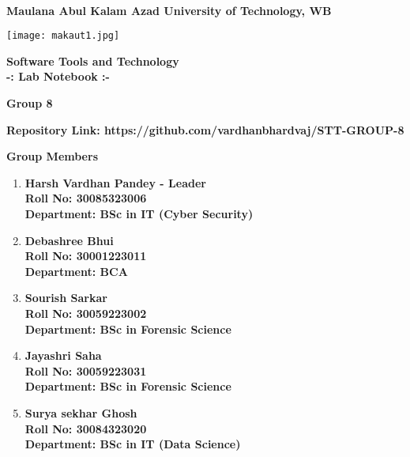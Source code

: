 \documentclass[a4paper,12pt]{article}
\begin{document}
\begin{titlepage}
    \centering
    \vspace*{0 cm}
    \Large\\
    \textbf{Maulana Abul Kalam Azad University of Technology, WB}
    \vspace{0.5cm}
    
    \texttt{[image: makaut1.jpg]} %
    \vspace{0.5cm}
    
    \LARGE
    \textbf{{Software Tools and Technology\\
        -: Lab Notebook :-}}
    \vspace{0.5cm}
    
    \large
    \textbf{Group 8}
    \vspace{1 cm}
    
    \textbf{Repository Link: https://github.com/vardhanbhardvaj/STT-GROUP-8}
    \vspace{1cm}
    
    \textbf{Group Members}
    \vspace{0.5cm}

    \normalsize
    \begin{enumerate}
        \item \textbf{Harsh Vardhan Pandey - Leader}\\ 
              \textbf{Roll No: 30085323006}\\   
              \textbf{Department: BSc in IT (Cyber Security)}
        \item \textbf{Debashree Bhui}\\
              \textbf{Roll No: 30001223011}\\
              \textbf{Department: BCA}
        \item \textbf{Sourish Sarkar}\\
              \textbf{Roll No: 30059223002}\\
              \textbf{Department: BSc in Forensic Science}
        \item \textbf{Jayashri Saha}\\
              \textbf{Roll No: 30059223031}\\
              \textbf{Department: BSc in Forensic Science}
        \item \textbf{Surya sekhar Ghosh}\\
              \textbf{Roll No: 30084323020}\\
              \textbf{Department: BSc in IT (Data Science)}
    \end{enumerate}
    \vspace{0.8 cm}

    \end{titlepage}
\end{document}
